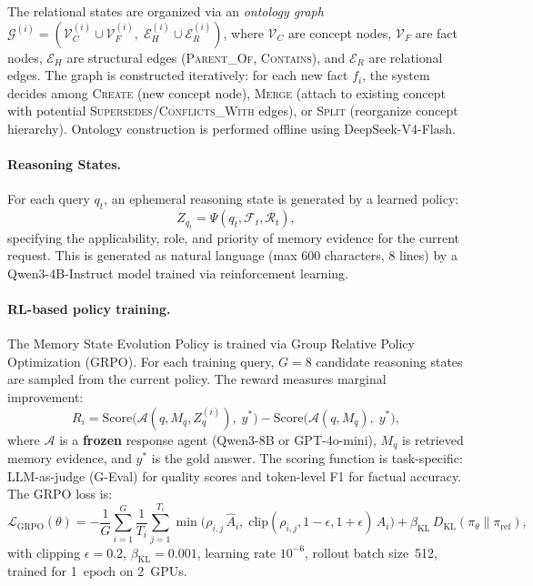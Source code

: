\documentclass[11pt,a4paper]{article}
\begin{document}
The relational states are organized via an \emph{ontology graph} $\mathcal{G}^{(i)} = (\mathcal{V}_C^{(i)} \cup \mathcal{V}_F^{(i)},\; \mathcal{E}_H^{(i)} \cup \mathcal{E}_R^{(i)})$, where $\mathcal{V}_C$ are concept nodes, $\mathcal{V}_F$ are fact nodes, $\mathcal{E}_H$ are structural edges (\textsc{Parent\_Of}, \textsc{Contains}), and $\mathcal{E}_R$ are relational edges. The graph is constructed iteratively: for each new fact $f_i$, the system decides among \textsc{Create} (new concept node), \textsc{Merge} (attach to existing concept with potential \textsc{Supersedes}/\textsc{Conflicts\_With} edges), or \textsc{Split} (reorganize concept hierarchy). Ontology construction is performed offline using DeepSeek-V4-Flash.

\paragraph{Reasoning States.}
For each query $q_t$, an ephemeral reasoning state is generated by a learned policy:
\begin{equation}
  Z_{q_t} = \Psi(q_t, \mathcal{F}_t, \mathcal{R}_t),
\end{equation}
specifying the applicability, role, and priority of memory evidence for the current request. This is generated as natural language (max 600 characters, 8 lines) by a Qwen3-4B-Instruct model trained via reinforcement learning.

\paragraph{RL-based policy training.}
The Memory State Evolution Policy is trained via Group Relative Policy Optimization (GRPO). For each training query, $G{=}8$ candidate reasoning states are sampled from the current policy. The reward measures marginal improvement:
\begin{equation}
  R_i = \mathrm{Score}\bigl(\mathcal{A}(q, M_q, Z_q^{(i)}),\; y^*\bigr) - \mathrm{Score}\bigl(\mathcal{A}(q, M_q),\; y^*\bigr),
\end{equation}
where $\mathcal{A}$ is a \textbf{frozen} response agent (Qwen3-8B or GPT-4o-mini), $M_q$ is retrieved memory evidence, and $y^*$ is the gold answer. The scoring function is task-specific: LLM-as-judge (G-Eval) for quality scores and token-level F1 for factual accuracy. The GRPO loss is:
\begin{equation}
  \mathcal{L}_{\mathrm{GRPO}}(\theta) = -\frac{1}{G}\sum_{i=1}^{G}\frac{1}{T_i}\sum_{j=1}^{T_i}\min\!\bigl(\rho_{i,j}\,\hat{A}_i,\;\mathrm{clip}(\rho_{i,j}, 1{-}\epsilon, 1{+}\epsilon)\,\hat{A}_i\bigr) + \beta_{\mathrm{KL}}\,D_{\mathrm{KL}}(\pi_\theta \| \pi_{\mathrm{ref}}),
\end{equation}
with clipping $\epsilon{=}0.2$, $\beta_{\mathrm{KL}}{=}0.001$, learning rate $10^{-6}$, rollout batch size~512, trained for 1~epoch on 2~GPUs.
\end{document}
